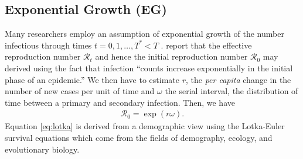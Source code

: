 \message{ !name(draft_v13.tex)}\documentclass[12pt]{article}
\newcommand{\rr}{\ensuremath{\mathcal{R}_0}}
\begin{document}
\subsection{Exponential Growth (EG)}\label{sec:expgrowth}
Many researchers employ an assumption of exponential growth of the number infectious through times $t=0, 1, \dots, T^* <T$ \citep{wallinga2007generation,fisman2014,nishiura2016,majumder2016,towers2016}.
\cite{wallinga2007generation} report that the effective reproduction number $\mathcal{R}_t$ and hence the initial reproduction number $\rr$ may derived using the fact that infection ``counts increase exponentially in the initial phase of an epidemic.''  We then have to estimate $r$, the \textit{per capita} change in the number of new cases per unit of time and $\omega$ the serial interval, the distribution of time between a primary and secondary infection. Then, we have
\begin{align}\label{eq:lotka}
\rr = \exp{(r \omega)}.
\end{align}
Equation \eqref{eq:lotka} is derived from a demographic view using the Lotka-Euler survival equations which come from the fields of demography, ecology, and evolutionary biology.
\end{document}
